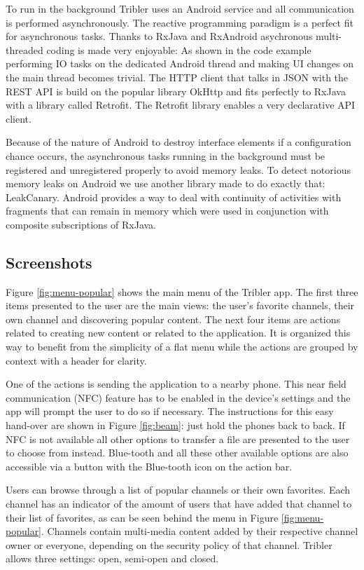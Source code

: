To run in the background Tribler uses an Android service and all communication is performed asynchronously.
The reactive programming paradigm is a perfect fit for asynchronous tasks.
Thanks to RxJava and RxAndroid asychronous multi-threaded coding is made very enjoyable:
As shown in the code example performing IO tasks on the dedicated Android thread and making UI changes on the main thread becomes trivial.
The HTTP client that talks in JSON with the REST API is build on the popular library OkHttp and fits perfectly to RxJava with a library called Retrofit.
The Retrofit library enables a very declarative API client.

Because of the nature of Android to destroy interface elements if a configuration chance occurs, the asynchronous tasks running in the background must be registered and unregistered properly to avoid memory leaks.
To detect notorious memory leaks on Android we use another library made to do exactly that: LeakCanary.
Android provides a way to deal with continuity of activities with fragments that can remain in memory which were used in conjunction with composite subscriptions of RxJava.

\subsection{Screenshots}
Figure \ref{fig:menu-popular} shows the main menu of the Tribler app.
The first three items presented to the user are the main views: the user's favorite channels, their own channel and discovering popular content.
The next four items are actions related to creating new content or related to the application.
It is organized this way to benefit from the simplicity of a flat menu while the actions are grouped by context with a header for clarity.

One of the actions is sending the application to a nearby phone.
This near field communication (NFC) feature has to be enabled in the device's settings and the app will prompt the user to do so if necessary.
The instructions for this easy hand-over are shown in Figure \ref{fig:beam}: just hold the phones back to back.
If NFC is not available all other options to transfer a file are presented to the user to choose from instead.
Blue-tooth and all these other available options are also accessible via a button with the Blue-tooth icon on the action bar.

Users can browse through a list of popular channels or their own favorites.
Each channel has an indicator of the amount of users that have added that channel to their list of favorites, as can be seen behind the menu in Figure \ref{fig:menu-popular}.
Channels contain multi-media content added by their respective channel owner or everyone, depending on the security policy of that channel.
Tribler allows three settings: open, semi-open and closed.

